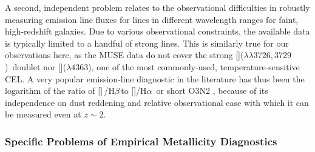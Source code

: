 \documentclass[traditabstract]{aa}
\newcommand{\hb}{H$\beta$}
\newcommand{\ha}{H$\alpha$}
\newcommand{\oii}{[\ion{O}{ii}]}
\newcommand{\oiii}{[\ion{O}{iii}]}
\newcommand{\nii}{[\ion{N}{ii}]}
\begin{document}
A second, independent problem relates to the observational difficulties in robustly measuring emission line fluxes for lines in different wavelength ranges for faint, high-redshift galaxies. Due to various observational constraints, the available data is typically limited to a handful of strong lines. This is similarly true for our observations here, as the MUSE data do not cover the strong \oii($\lambda\lambda3726,3729$)~doublet nor \oiii($\lambda 4363$), one of the most commonly-used, temperature-sensitive CEL. A very popular emission-line diagnostic in the literature has thus been the logarithm of the ratio of \oiii\,/\hb\,to \nii/\ha\, or short O3N2 \citep[e.g.][]{2004MNRAS.348L..59P, 2013A&A...559A.114M}, because of its independence on dust reddening and relative observational ease with which it can be measured even at $z\sim 2$.

\subsubsection{Specific Problems of Empirical Metallicity Diagnostics}
\end{document}
